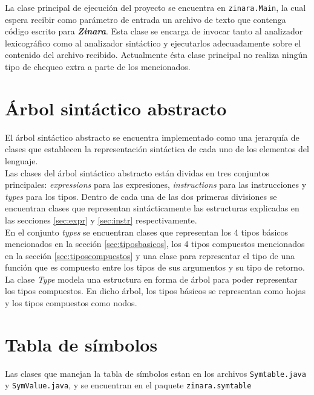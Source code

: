\documentclass[12pt, spanish]{report}
\begin{document}
La clase principal de ejecuci\'on del proyecto se encuentra en
\texttt{zinara.Main}, la cual espera recibir como par\'ametro de entrada
un archivo de texto que contenga c\'odigo escrito para
\emph{\textbf{Zinara}}. Esta clase se encarga de invocar tanto al
analizador lexicogr\'afico como al analizador sint\'actico y ejecutarlos
adecuadamente sobre el contenido del archivo recibido. Actualmente
\'esta clase principal no realiza ning\'un tipo de chequeo extra a parte
de los mencionados.

\section{\'Arbol sint\'actico abstracto}
\label{sec:ast}

El \'arbol sint\'actico abstracto se encuentra implementado como una
jerarqu\'ia de clases que establecen la representaci\'on sint\'actica de
cada uno de los elementos del lenguaje.\\

Las clases del \'arbol sint\'actico abstracto est\'an dividas en tres
conjuntos principales: \emph{expressions} para las expresiones,
\emph{instructions} para las instrucciones y \emph{types} para los
tipos. Dentro de cada una de las dos primeras divisiones se encuentran
clases que representan sint\'acticamente las estructuras explicadas en
las secciones \ref{sec:expr} y \ref{sec:instr} respectivamente.\\

En el conjunto \emph{types} se encuentran clases que representan los 4
tipos b\'asicos mencionados en la secci\'on \ref{sec:tiposbasicos}, los 4
tipos compuestos mencionados en la secci\'on \ref{sec:tiposcompuestos} y una
clase para representar el tipo de una funci\'on que es compuesto entre
los tipos de sus argumentos y su tipo de retorno.\\

La clase \emph{Type} modela una estructura en forma de \'arbol para
poder representar los tipos compuestos. En dicho \'arbol, los tipos
b\'asicos se representan como hojas y los tipos compuestos como nodos.

\section{Tabla de s\'imbolos}
\label{sec:st}

Las clases que manejan la tabla de s\'imbolos estan en los archivos
\texttt{Symtable.java} y \texttt{SymValue.java}, y se encuentran en el paquete
\texttt{zinara.symtable}
\end{document}
